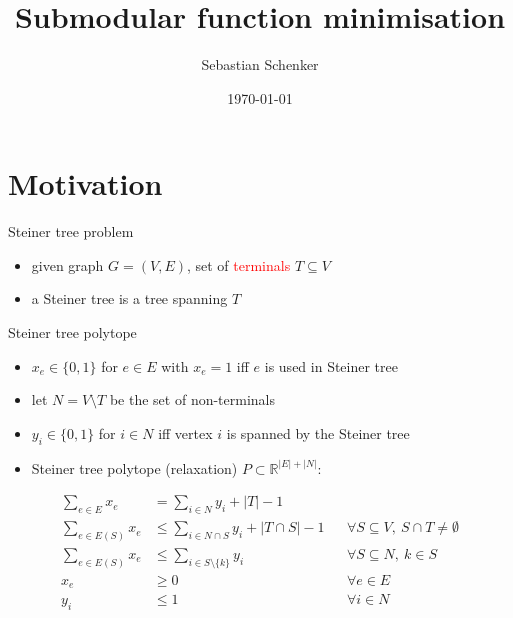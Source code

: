 \documentclass[usenames,dvipsnames]{beamer}
\title{Submodular function minimisation}
\date[]{\today}
\author[S. Schenker]{Sebastian Schenker}
\newcommand{\R}{\mathbb{R}}
\begin{document}
\maketitle

\begin{frame}
  \tableofcontents
\end{frame}

\section{Motivation}
\begin{frame}{Steiner tree problem}
  \begin{center}
    \end{center}
  \begin{itemize}
  \item given graph $G = (V,E)$, set of \textcolor{red}{terminals} $T \subseteq V$
  \item a Steiner tree is a tree spanning $T$
  \end{itemize}
\end{frame}

\begin{frame}{Steiner tree polytope}
  \begin{itemize}
  \item $x_e \in \{0,1\}$ for $e \in E$ with $x_e = 1$ iff  $e$ is used in Steiner tree
  \item let $N = V \setminus T$ be the set of non-terminals
  \item $y_i \in \{0,1\}$ for $i \in N$ iff vertex $i$ is spanned by the Steiner tree
  \item Steiner tree polytope (relaxation) $P \subset \R^{|E| + |N|}$:
  \end{itemize}
  \begin{align}
    \sum\limits_{e \in E} x_e &= \sum\limits_{i \in N} y_i + |T| - 1\\
    \sum\limits_{e \in E(S)} x_e &\leq \sum\limits_{i \in N \cap S} y_i + |T \cap S| -1 &&\forall S \subseteq V,~S \cap T \neq \emptyset\\
    \sum\limits_{e \in E(S)} x_e &\leq \sum\limits_{i \in S \setminus \{k\}} y_i &&\forall S \subseteq N,~k \in S\\
    x_e &\geq 0 &&\forall e \in E\\
    y_i & \leq 1 &&\forall i \in N
  \end{align}
\end{frame}
\end{document}
